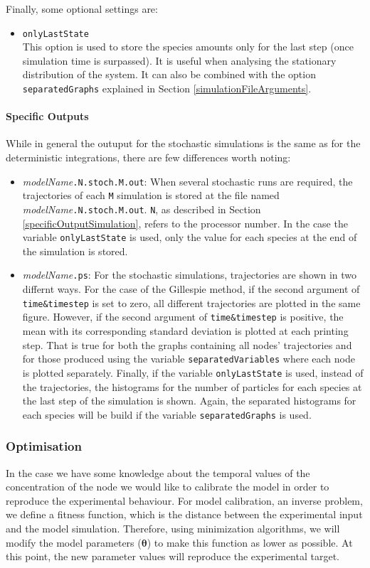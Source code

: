 \documentclass[a4paper, 11pt]{article}
\begin{document}
Finally, some optional settings are:
\begin{itemize}
\item \texttt{onlyLastState}\\[1.5ex]
  This option is used to store the species amounts only for the last step (once simulation time is surpassed). 
  It is useful when analysing the stationary distribution of the system.
  It can also be combined with the option \texttt{separatedGraphs} explained in Section \ref{simulationFileArguments}.
\end{itemize}
\paragraph{Specific Outputs}
While in general the outuput for the stochastic simulations is the same as for the deterministic integrations, there are few differences worth noting:
\begin{itemize}
  \item \textit{modelName}\texttt{.N.stoch.M.out}:
    When several stochastic runs are required, the trajectories of each \texttt{M} simulation is stored at the file named \textit{modelName}\texttt{.N.stoch.M.out}. 
    \texttt{N}, as described in Section \ref{specificOutputSimulation}, refers to the processor number.
    In the case the variable \texttt{onlyLastState} is used, only the value for each species at the end of the simulation is stored.
  \item \textit{modelName}\texttt{.ps}:
    For the stochastic simulations, trajectories are shown in two differnt ways. 
    For the case of the Gillespie method, if the second argument of \texttt{time\&timestep} is set to zero, all different trajectories are plotted in the same figure.
    However, if the second argument of \texttt{time\&timestep} is positive, the mean with its corresponding standard deviation is plotted at each printing step.
    That is true for both the graphs containing all nodes' trajectories and for those produced using the variable \texttt{separatedVariables} where each node is plotted separately.
    Finally, if the variable \texttt{onlyLastState} is used, instead of the trajectories, the histograms for the number of particles for each species at the last step of the simulation is shown.
    Again, the separated histograms for each species will be build if the variable \texttt{separatedGraphs} is used.
\end{itemize}
\subsubsection{Optimisation} \label{optimisationSection}
In the case we have some knowledge about the temporal values of the concentration of the node we would like to calibrate the model in order to reproduce the experimental behaviour.
For model calibration, an inverse problem, we define a fitness function, which is the distance between the experimental input and the model simulation.
Therefore, using minimization algorithms, we will modify the model parameters ($\bm{\theta}$) to make this function as lower as possible.
At this point, the new parameter values will reproduce the experimental target.
\end{document}
